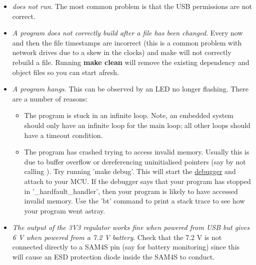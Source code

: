 \begin{itemize}
\item
  \emph{ does not run}. The most common problem is that the
  USB permissions are not correct.
\item
  \emph{A program does not correctly build after a file has been
  changed}. Every now and then the file timestamps are incorrect (this
  is a common problem with network drives due to a skew in the clocks)
  and make will not correctly rebuild a file. Running \textbf{make
  clean} will remove the existing dependency and object files so you can
  start afresh.
\item
  \emph{A program hangs.} This can be observed by an LED no longer
  flashing. There are a number of reasons:

  \begin{itemize}
  \item
    The program is stuck in an infinite loop. Note, an embedded system
    should only have an infinite loop for the main loop; all other loops
    should have a timeout condition.
  \item
    The program has crashed trying to access invalid memory. Usually
    this is due to buffer overflow or dereferencing uninitialised
    pointers (say by not calling ). Try running
    'make debug'. This will start the
    \protect\hyperref[debugging]{debugger} and attach to your MCU. If
    the debugger says that your program has stopped in
    '\_hardfault\_handler', then your program is likely to have accessed
    invalid memory. Use the 'bt' command to print a stack trace to see
    how your program went astray.
  \end{itemize}
\item
  \emph{The output of the 3V3 regulator works fine when powered from USB
  but gives 6 V when powered from a 7.2 V battery}. Check that the 7.2 V
  is not connected directly to a SAM4S pin (say for battery monitoring)
  since this will cause an ESD protection diode inside the SAM4S to
  conduct.
\end{itemize}

